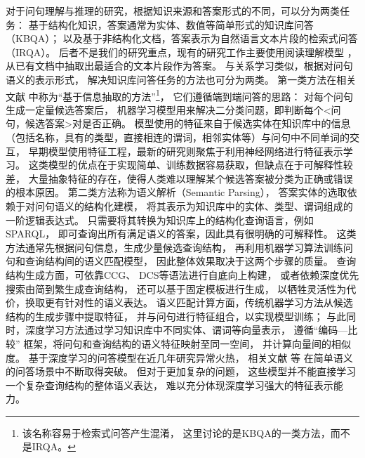 对于问句理解与推理的研究，根据知识来源和答案形式的不同，可以分为两类任务：
基于结构化知识，答案通常为实体、数值等简单形式的知识库问答（KBQA）；
以及基于非结构化文档，答案表示为自然语言文本片段的检索式问答（IRQA）。
后者不是我们的研究重点，现有的研究工作主要使用阅读理解模型
\parencite{chen2017reading,seo2016bidirectional}，
从已有文档中抽取出最适合的文本片段作为答案。
与关系学习类似，根据对问句语义的表示形式，
解决知识库问答任务的方法也可分为两类。
第一类方法在相关文献\parencite{yao2014information,yao2015lean,dong2014knowledge,hao2017end}
中称为``{基于信息抽取的方法}''\footnote{该名称容易于检索式问答产生混淆，
这里讨论的是KBQA的一类方法，而不是IRQA。}，
它们遵循端到端问答的思路：
对每个问句生成一定量候选答案后，
机器学习模型用来解决二分类问题，即判断每个\textless 问句，候选答案\textgreater 对是否正确。
模型使用的特征来自于候选实体在知识库中的信息
（包括名称，具有的类型，直接相连的谓词，相邻实体等）与问句中不同单词的交互，
早期模型使用特征工程，最新的研究则聚焦于利用神经网络进行特征表示学习。
这类模型的优点在于实现简单、训练数据容易获取，但缺点在于可解释性较差，
大量抽象特征的存在，使得人类难以理解某个候选答案被分类为正确或错误的根本原因。
第二类方法称为语义解析（Semantic Parsing），
答案实体的选取依赖于对问句语义的结构化建模，
将其表示为知识库中的实体、类型、谓词组成的一阶逻辑表达式。
只需要将其转换为知识库上的结构化查询语言，例如SPARQL，
即可查询出所有满足语义的答案，因此具有很明确的可解释性。
这类方法通常先根据问句信息，生成少量候选查询结构，
再利用机器学习算法训练问句和查询结构间的语义匹配模型，
因此整体效果取决于这两个步骤的质量。
查询结构生成方面，可依靠CCG\cite{cai2013large,kwiatkowski2013scaling}、
DCS\cite{berant2013semantic,berant2014semantic}等语法进行自底向上构建，
或者依赖深度优先搜索由简到繁生成查询结构\cite{yih2015semantic,bao2016constraint}，
还可以基于固定模板进行生成\cite{cui2017kbqa,bast2015more}，
以牺牲灵活性为代价，换取更有针对性的语义表达。
语义匹配计算方面，传统机器学习方法从候选结构的生成步骤中提取特征，
并与问句进行特征组合，以实现模型训练；
与此同时，深度学习方法通过学习知识库中不同实体、谓词等向量表示，
遵循``{编码—比较}'' 框架，将问句和查询结构的语义特征映射至同一空间，
并计算向量间的相似度。
基于深度学习的问答模型在近几年研究异常火热，
相关文献
\parencite{bordes2014open,bordes2015large,yin2016simple,yu2017improved,lukovnikov2017neural}等
在简单语义的问答场景中不断取得突破。
但对于更加复杂的问题，
这些模型并不能直接学习一个复杂查询结构的整体语义表达，
难以充分体现深度学习强大的特征表示能力。


